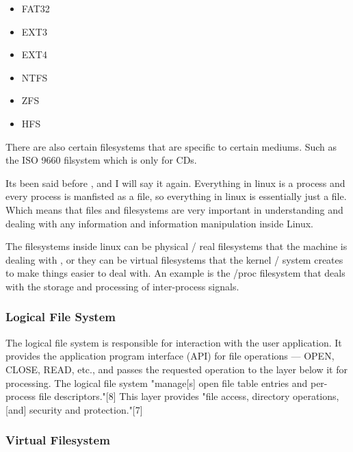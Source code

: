 
\begin{itemize}[noitemsep]

	\item FAT32
	\item EXT3
	\item EXT4
	\item NTFS
	\item ZFS
	\item HFS

\end{itemize}


There are also certain filesystems that are specific to certain mediums. Such as
the ISO 9660 filsystem which is only for CDs.

Its been said before , and I will say it again. Everything in linux is a process
and every process is manfisted as a file, so everything in linux is essentially
just a file. Which means that files and filesystems are very important in
understanding and dealing with any information and information manipulation
inside Linux.

The filesystems inside linux can be physical / real filesystems that the machine
is dealing with , or they can be virtual filesystems that the kernel / system
creates to make things easier to deal with. An example is the /proc filesystem
that deals with the storage and processing of inter-process signals.


\subsubsection{Logical File System}
\label{sssec:logical_file_system}

The logical file system is responsible for interaction with the user
application. It provides the application program interface (API) for file
operations — OPEN, CLOSE, READ, etc., and passes the requested operation to the
layer below it for processing. The logical file system "manage[s] open file
table entries and per-process file descriptors."[8] This layer provides "file
access, directory operations, [and] security and protection."[7]


\subsubsectionend

\subsubsection{Virtual Filesystem}
\label{sssec:virtual_filesystem}


